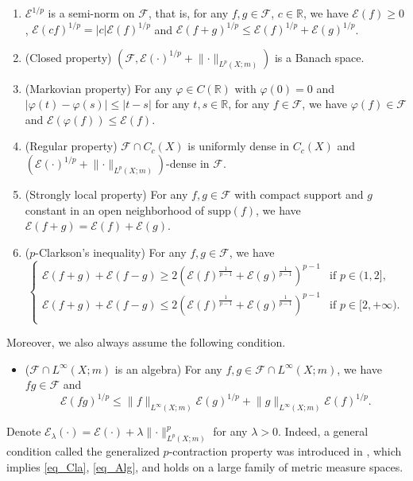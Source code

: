 \documentclass[10pt,a4paper]{amsart}
\numberwithin{equation}{section}
\begin{document}
\begin{enumerate}[label=(\arabic*)]
\item $\mathcal{E}^{1/p}$ is a semi-norm on $\mathcal{F}$, that is, for any $f,g\in\mathcal{F}$, $c\in\mathbb{R}$, we have $\mathcal{E}(f)\ge0$, $\mathcal{E}(cf)^{1/p}=|c|\mathcal{E}(f)^{1/p}$ and $\mathcal{E}(f+g)^{1/p}\le\mathcal{E}(f)^{1/p}+\mathcal{E}(g)^{1/p}$.
\item (Closed property) $(\mathcal{F},\mathcal{E}(\cdot)^{1/p}+\lVert {\cdot}\rVert_{L^p(X;m)})$ is a Banach space.
\item (Markovian property) For any $\varphi\in C(\mathbb{R})$ with $\varphi(0)=0$ and $|\varphi(t)-\varphi(s)|\le|t-s|$ for any $t,s\in\mathbb{R}$, for any $f\in\mathcal{F}$, we have $\varphi(f)\in\mathcal{F}$ and $\mathcal{E}(\varphi(f))\le\mathcal{E}(f)$.
\item (Regular property) $\mathcal{F}\cap C_c(X)$ is uniformly dense in $C_c(X)$ and $(\mathcal{E}(\cdot)^{1/p}+\lVert {\cdot}\rVert_{L^p(X;m)})$-dense in $\mathcal{F}$.
\item (Strongly local property) For any $f,g\in\mathcal{F}$ with compact support and $g$ constant in an open neighborhood of $\mathrm{supp}(f)$, we have $\mathcal{E}(f+g)=\mathcal{E}(f)+\mathcal{E}(g)$.
\item ($p$-Clarkson's inequality) For any $f,g\in\mathcal{F}$, we have
\begin{equation*}\label{eq_Cla}\tag*{Cla}
\begin{cases}
\mathcal{E}(f+g)+\mathcal{E}(f-g)\ge2 \left(\mathcal{E}(f)^{\frac{1}{p-1}}+\mathcal{E}(g)^{\frac{1}{p-1}}\right)^{p-1}&\text{if }p\in(1,2],\\
\mathcal{E}(f+g)+\mathcal{E}(f-g)\le2 \left(\mathcal{E}(f)^{\frac{1}{p-1}}+\mathcal{E}(g)^{\frac{1}{p-1}}\right)^{p-1}&\text{if }p\in[2,+\infty).\\
\end{cases}
\end{equation*}
\end{enumerate}
Moreover, we also always assume the following condition.
\begin{itemize}
\item ($\mathcal{F}\cap L^\infty(X;m)$ is an algebra) For any $f,g\in\mathcal{F}\cap L^\infty(X;m)$, we have $fg\in\mathcal{F}$ and
\begin{equation*}\label{eq_Alg}\tag*{Alg}
\mathcal{E}(fg)^{{1}/{p}}\le \lVert f\rVert_{L^\infty(X;m)}\mathcal{E}(g)^{1/p}+\lVert g\rVert_{L^\infty(X;m)}\mathcal{E}(f)^{1/p}.
\end{equation*}
\end{itemize}
Denote $\mathcal{E}_\lambda(\cdot)=\mathcal{E}(\cdot)+\lambda \lVert {\cdot}\rVert^p_{L^p(X;m)}$ for any $\lambda>0$. Indeed, a general condition called the generalized $p$-contraction property was introduced in \cite{KS24a}, which implies \ref{eq_Cla}, \ref{eq_Alg}, and holds on a large family of metric measure spaces.
\end{document}
